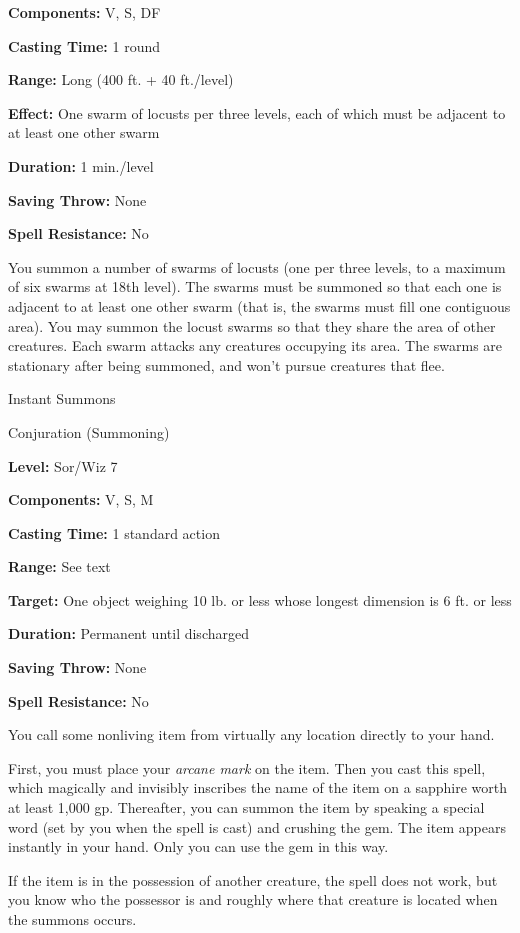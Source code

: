 \documentclass{article}
\begin{document}
\textbf{Components:} V, S, DF

\textbf{Casting Time:} 1 round

\textbf{Range:} Long (400 ft. + 40 ft./level)

\textbf{Effect:} One swarm of locusts per three levels, each of which must be adjacent 
to at least one other swarm

\textbf{Duration:} 1 min./level

\textbf{Saving Throw:} None

\textbf{Spell Resistance:} No

You summon a number of swarms of locusts (one per three levels, to a maximum of 
six swarms at 18th level). The swarms must be summoned so that each one is adjacent 
to at least one other swarm (that is, the swarms must fill one contiguous area). 
You may summon the locust swarms so that they share the area of other creatures. 
Each swarm attacks any creatures occupying its area. The swarms are stationary 
after being summoned, and won't pursue creatures that flee.

\vspace{12pt}
Instant Summons

Conjuration (Summoning)

\textbf{Level:} Sor/Wiz 7

\textbf{Components:} V, S, M

\textbf{Casting Time:} 1 standard action

\textbf{Range:} See text

\textbf{Target:} One object weighing 10 lb. or less whose longest dimension is 
6 ft. or less

\textbf{Duration:} Permanent until discharged

\textbf{Saving Throw:} None

\textbf{Spell Resistance:} No

You call some nonliving item from virtually any location directly to your hand.

First, you must place your \textit{arcane mark} on the item. Then you cast this 
spell, which magically and invisibly inscribes the name of the item on a sapphire 
worth at least 1,000 gp. Thereafter, you can summon the item by speaking a special 
word (set by you when the spell is cast) and crushing the gem. The item appears 
instantly in your hand. Only you can use the gem in this way.

If the item is in the possession of another creature, the spell does not work, 
but you know who the possessor is and roughly where that creature is located when 
the summons occurs.
\end{document}
